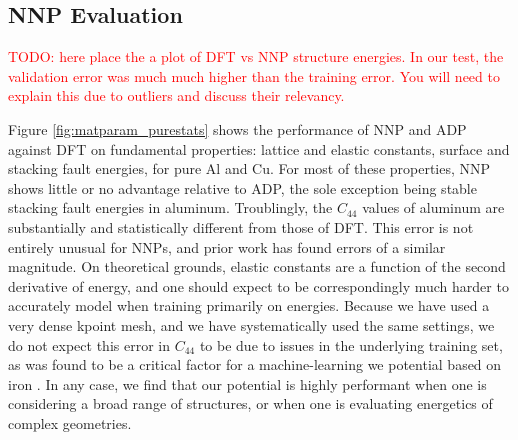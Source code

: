 \documentclass{article}
\begin{document}
\subsection{NNP Evaluation}
\textcolor{red}{TODO: here place the a plot of DFT vs NNP structure energies.
In our test, the validation error was much much higher than the training error.
You will need to explain this due to outliers and discuss their relevancy. }

Figure \ref{fig:matparam_purestats} shows the performance of NNP and ADP against DFT on fundamental properties: lattice and elastic constants, surface and stacking fault energies, for pure Al and Cu.
For most of these properties, NNP shows little or no advantage relative to ADP, the sole exception being stable stacking fault energies in aluminum.
Troublingly, the $C_{44}$ values of aluminum are substantially and statistically different from those of DFT.
This error is not entirely unusual for NNPs, and prior work has found errors of a similar magnitude\cite{Zuo2020APotentials}.
On theoretical grounds, elastic constants are a function of the second derivative of energy, and one should expect to be correspondingly much harder to accurately model when training primarily on energies.
Because we have used a very dense kpoint mesh, and we have systematically used the same settings, we do not expect this error in $C_{44}$ to be due to issues in the underlying training set, as was found to be a critical factor for a machine-learning we potential based on iron \cite{Dragoni2018AchievingIron}.  
In any case, we find that our potential is highly performant when one is considering a broad range of structures, or when one is evaluating energetics of complex geometries. 
\end{document}
